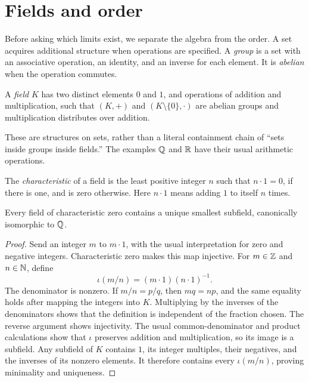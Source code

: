 \section{Fields and order}
\label{sec:analysis-i:fields-and-order}

Before asking which limits exist, we separate the algebra from the order.
A set acquires additional structure when operations are specified.
A \emph{group} is a set with an associative operation, an identity, and an
inverse for each element. It is \emph{abelian} when the operation commutes.

\begin{definition}
  A \emph{field} $K$ has two distinct elements $0$ and $1$, and operations
  of addition and multiplication, such that $(K,+)$ and $(K\setminus\{0\},\cdot)$
  are abelian groups and multiplication distributes over addition.
\end{definition}
These are structures on sets, rather than a literal containment chain of
``sets inside groups inside fields.'' The examples $\mathbb{Q}$ and $\mathbb{R}$ have their
usual arithmetic operations.

The \emph{characteristic} of a field is the least positive integer $n$ such
that $n\cdot1=0$, if there is one, and is zero otherwise. Here $n\cdot1$
means adding $1$ to itself $n$ times.

\begin{proposition}
  Every field of characteristic zero contains a unique smallest subfield,
  canonically isomorphic to $\mathbb{Q}$.
\end{proposition}
\begin{proof}
  Send an integer $m$ to $m\cdot1$, with the usual interpretation for
  zero and negative integers. Characteristic zero makes this map injective.
  For $m\in\mathbb{Z}$ and $n\in\mathbb{N}$, define
  \[
    \iota(m/n)=(m\cdot1)(n\cdot1)^{-1}.
  \]
  The denominator is nonzero. If $m/n=p/q$, then $mq=np$, and the same
  equality holds after mapping the integers into $K$. Multiplying by the
  inverses of the denominators shows that the definition is independent
  of the fraction chosen. The reverse argument shows injectivity.
  The usual common-denominator and product calculations show that $\iota$
  preserves addition and multiplication, so its image is a subfield.
  Any subfield of $K$ contains $1$, its integer multiples, their negatives,
  and the inverses of its nonzero elements. It therefore contains every
  $\iota(m/n)$, proving minimality and uniqueness.
\end{proof}

